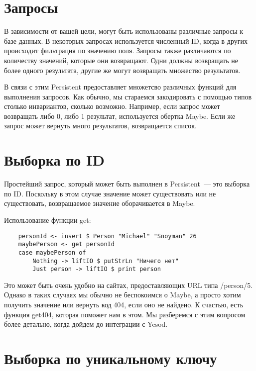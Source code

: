 \section{Запросы} %

В зависимости от вашей цели, могут быть использованы различные запросы к базе данных. В некоторых запросах используется численный ID, когда в других происходит фильтрация по значению поля. Запросы также различаются по количеству значений, которые они возвращают. Одни должны возвращать не более одного результата, другие же могут возвращать множество результатов.

В связи с этим Persistent предоставляет множетсво различных функций для выполнения запросов. Как обычно, мы стараемся закодировать с помощью типов столько инвариантов, сколько возможно. Например, если запрос может возвращать либо 0, либо 1 результат, используется обертка Maybe. Если же запрос может вернуть много результатов, возвращается список.

\section{Выборка по ID} %

Простейший запрос, который может быть выполнен в Persistent~--- это выборка по ID. Поскольку в этом случае значение может существовать или не существовать, возвращаемое значение оборачивается в Maybe.

Использование функции get:

\begin{lstlisting}
    personId <- insert $ Person "Michael" "Snoyman" 26
    maybePerson <- get personId
    case maybePerson of
        Nothing -> liftIO $ putStrLn "Ничего нет"
        Just person -> liftIO $ print person
\end{lstlisting}%

Это может быть очень удобно на сайтах, предоставляющих URL типа /person/5. Однако в таких случаях мы обычно не беспокоимся о Maybe, а просто хотим получить значение или вернуть код 404, если оно не найдено. К счастью, есть функция get404, которая поможет нам в этом. Мы разберемся с этим вопросом более детально, когда дойдем до интеграции с Yesod. 

\section{Выборка по уникальному ключу} %

